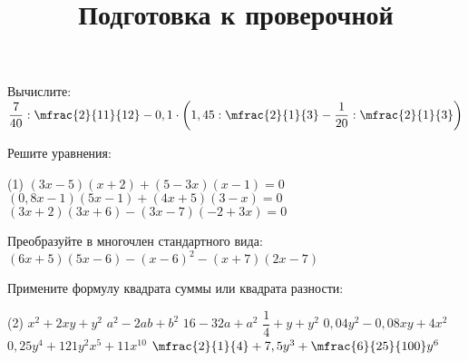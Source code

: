 \begin{class}[number=7]
	\title{Подготовка к проверочной}
	\begin{listofex}
		\item Вычислите: \( \dfrac{7}{40} : \mfrac{2}{11}{12} - 0,1 \cdot \left( 1,45 : \mfrac{2}{1}{3} - \dfrac{1}{20} : \mfrac{2}{1}{3} \right) \)
		\item Решите уравнения:
		\begin{tasks}(1)
			\task \( (3x-5)(x+2)+(5-3x)(x-1)=0 \)
			\task \( (0,8x-1)(5x-1)+(4x+5)(3-x)=0 \)
			\task \( (3x+2)(3x+6)-(3x-7)(-2+3x)=0 \)
		\end{tasks}
		\item Преобразуйте в многочлен стандартного вида: \( (6x+5)(5x-6)-(x-6)^2-(x+7)(2x-7) \)
		\item Примените формулу квадрата суммы или квадрата разности:
		\begin{tasks}(2)
			\task \( x^2+2xy+y^2 \)
			\task \( a^2-2ab+b^2 \)
			\task \( 16-32a+a^2 \)
			\task \( \dfrac{1}{4} + y + y^2 \)
			\task \( 0,04y^2-0,08xy+4x^2 \)
			\task \( 0,25y^4+121y^2x^5+11x^{10} \)
			\task \( \mfrac{2}{1}{4}+7,5y^3+\mfrac{6}{25}{100}y^6 \)
		\end{tasks}
	\end{listofex}
\end{class}

